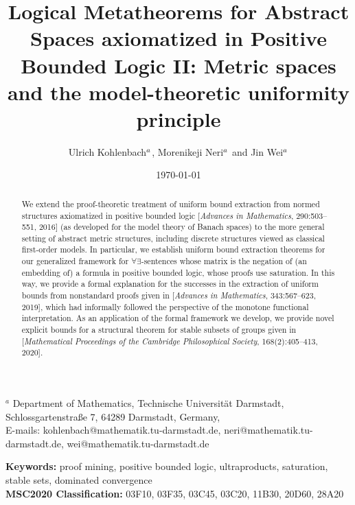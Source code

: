 \documentclass[11pt]{amsart}
\theoremstyle{definition}
\theoremstyle{remark}
\begin{document}
\title[Logical Metatheorems for Abstract Spaces in Positive
Bounded Logic II]{Logical Metatheorems for Abstract Spaces axiomatized in Positive
Bounded Logic II: Metric spaces and the model-theoretic uniformity principle}

\author[Ulrich Kohlenbach, Morenikeji Neri and Jin Wei]{Ulrich Kohlenbach${}^{\MakeLowercase a}$, Morenikeji Neri${}^{\MakeLowercase a}$ and Jin Wei${}^{\MakeLowercase a}$}
\date{\today}
\maketitle
\vspace*{-5mm}
\begin{center}
{\scriptsize 
${}^a$ Department of Mathematics, Technische Universit\"at Darmstadt,\\
Schlossgartenstra\ss{}e 7, 64289 Darmstadt, Germany,\\ 
E-mails:  kohlenbach@mathematik.tu-darmstadt.de, neri@mathematik.tu-darmstadt.de, wei@mathematik.tu-darmstadt.de}
\end{center}

\maketitle
\begin{abstract}
We extend the proof-theoretic treatment of uniform bound extraction from normed structures axiomatized in positive bounded logic [\emph{Advances in Mathematics}, 290:503--551, 2016] (as developed for the model theory of Banach spaces) to the more general setting of abstract metric structures, including discrete structures viewed as classical first-order models. In particular, we establish uniform bound extraction theorems for our generalized framework for $\forall\exists$-sentences whose matrix is the negation of (an embedding of) a formula in positive bounded logic, whose proofs use saturation. In this way, we provide a formal explanation for the successes in the extraction of uniform bounds from nonstandard proofs given in [\emph{Advances in Mathematics}, 343:567--623, 2019], which had informally followed the perspective of the monotone functional interpretation. As an application of the formal framework we develop, we provide novel explicit bounds for a structural theorem for stable subsets of groups given in [\emph{Mathematical Proceedings of the Cambridge Philosophical Society}, 168(2):405--413, 2020].
\end{abstract}
\noindent
{\bf Keywords:} proof mining, positive bounded logic, ultraproducts, saturation, stable sets, dominated convergence \\ 
{\bf MSC2020 Classification:} 03F10, 03F35, 03C45, 03C20, 11B30, 20D60, 28A20
\end{document}
